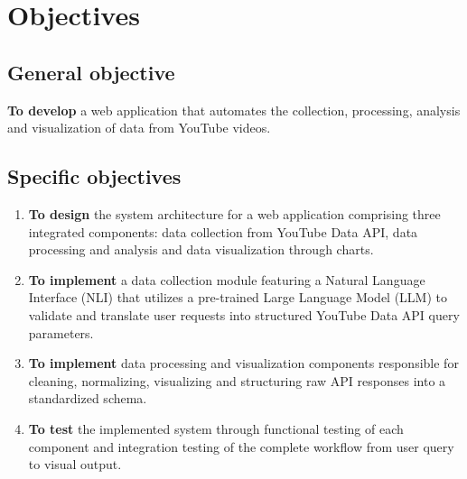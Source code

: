 \chapter{Objectives}
\label{chap:objectives}

\section{General objective}

\textbf{To develop} a web application that automates the collection, processing, analysis and visualization of data from YouTube videos.

\section{Specific objectives}

\begin{enumerate}
    \item \label{obj:design} \textbf{To design} the system architecture for a web application comprising three integrated components: data collection from YouTube Data API, data processing and analysis and data visualization through charts.

    \item \label{obj:implement_collection} \textbf{To implement} a data collection module featuring a Natural Language Interface (NLI) that utilizes a pre-trained Large Language Model (LLM) to validate and translate user requests into structured YouTube Data API query parameters.

    \item \label{obj:implement_processing_analysis_and_visualization} \textbf{To implement} data processing and visualization components responsible for cleaning, normalizing, visualizing and structuring raw API responses into a standardized schema.


    \item \label{obj:test} \textbf{To test} the implemented system through functional testing of each component and integration testing of the complete workflow from user query to visual output.
\end{enumerate}
